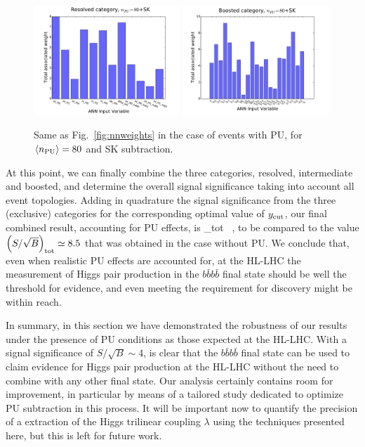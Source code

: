 \begin{figure}[t]
\begin{center}
\includegraphics[width=0.49\textwidth]{plots/res_wgthist_SKPU80.pdf}
\includegraphics[width=0.49\textwidth]{plots/bst_wgthist_SKPU80.pdf}
\vspace{-0.5cm}
\caption{\small
Same as Fig.~\ref{fig:nnweights} in the
case of events with PU, for
 $\left\langle n_{\rm PU}\right\rangle=80$ 
  and SK subtraction.
}
\label{fig:nnweights_PU}
\end{center}
\end{figure}

At this point, we can finally combine the three categories, resolved,
intermediate and boosted, and determine the overall signal
significance taking into account all event topologies.
%
Adding in quadrature the signal significance from the three
(exclusive) categories for the corresponding
optimal value of $y_{\rm cut}$, our final combined result, accounting
for PU effects, is
\be
\lp {}\rp_{\rm tot}  \, ,
\ee
to be compared to the value $\left( S/\sqrt{B}\right)_{\rm tot} \simeq 8.5$
that was obtained in the case without PU.
%
We conclude that, even when realistic PU effects are accounted
for, at the HL-LHC the measurement of
Higgs pair production in the $b\bar{b}b\bar{b}$ final state should be 
well the threshold for evidence, and even meeting the
requirement for discovery might be within reach.
%

In summary, in this section we have demonstrated the robustness
of our results under the presence of PU conditions as those
expected at the HL-LHC.
%
With a signal significance of $S/\sqrt{B}\sim 4$, is clear that
the $b\bar{b}b\bar{b}$ final state can be used to claim evidence
for Higgs pair production at the HL-LHC without the need
to combine with any other final state.
%
Our analysis certainly contains
room for improvement, in particular by means of a tailored
study dedicated to optimize PU subtraction in this process.
%
It will be important now to quantify the precision of
a extraction of the Higgs trilinear coupling $\lambda$ using
the techniques presented here, but this is left for future work.

